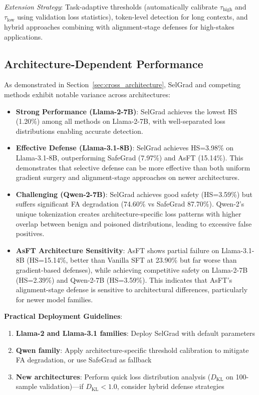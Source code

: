 \textit{Extension Strategy}: Task-adaptive thresholds (automatically calibrate $\tau_{\text{high}}$ and $\tau_{\text{low}}$ using validation loss statistics), token-level detection for long contexts, and hybrid approaches combining with alignment-stage defenses for high-stakes applications.

\subsection{Architecture-Dependent Performance}

As demonstrated in Section~\ref{sec:cross_architecture}, SelGrad and competing methods exhibit notable variance across architectures:

\begin{itemize}
    \item \textbf{Strong Performance (Llama-2-7B)}: SelGrad achieves the lowest HS (1.20\%) among all methods on Llama-2-7B, with well-separated loss distributions enabling accurate detection.

    \item \textbf{Effective Defense (Llama-3.1-8B)}: SelGrad achieves HS=3.98\% on Llama-3.1-8B, outperforming SafeGrad (7.97\%) and AsFT (15.14\%). This demonstrates that selective defense can be more effective than both uniform gradient surgery and alignment-stage approaches on newer architectures.

    \item \textbf{Challenging (Qwen-2-7B)}: SelGrad achieves good safety (HS=3.59\%) but suffers significant FA degradation (74.60\% vs SafeGrad 87.70\%). Qwen-2's unique tokenization creates architecture-specific loss patterns with higher overlap between benign and poisoned distributions, leading to excessive false positives.

    \item \textbf{AsFT Architecture Sensitivity}: AsFT shows partial failure on Llama-3.1-8B (HS=15.14\%, better than Vanilla SFT at 23.90\% but far worse than gradient-based defenses), while achieving competitive safety on Llama-2-7B (HS=2.39\%) and Qwen-2-7B (HS=3.59\%). This indicates that AsFT's alignment-stage defense is sensitive to architectural differences, particularly for newer model families.
\end{itemize}

\textbf{Practical Deployment Guidelines}:
\begin{enumerate}
    \item \textbf{Llama-2 and Llama-3.1 families}: Deploy SelGrad with default parameters
    \item \textbf{Qwen family}: Apply architecture-specific threshold calibration to mitigate FA degradation, or use SafeGrad as fallback
    \item \textbf{New architectures}: Perform quick loss distribution analysis ($D_{\text{KL}}$ on 100-sample validation)---if $D_{\text{KL}} < 1.0$, consider hybrid defense strategies
\end{enumerate}

